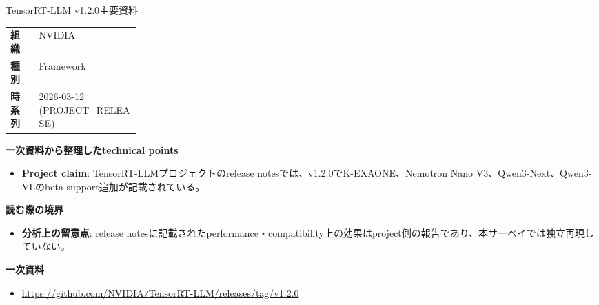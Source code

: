\begin{technicalnote}{TensorRT-LLM v1.2.0}{主要資料}
\begingroup
\begin{tabularx}{\linewidth}{@{}>{\bfseries}p{0.22\linewidth}X@{}}
組織 & NVIDIA \\
種別 & Framework \\
時系列 & 2026-03-12 (PROJECT\_RELEASE) \\
\end{tabularx}
\smallskip
{\bfseries 一次資料から整理したtechnical points}
\begin{itemize}[leftmargin=1.5em,itemsep=0.35em]
\item \textbf{Project claim}: TensorRT-LLMプロジェクトのrelease notesでは、v1.2.0でK-EXAONE、Nemotron Nano V3、Qwen3-Next、Qwen3-VLのbeta support追加が記載されている。
\end{itemize}
\begin{minipage}{\linewidth}
{\bfseries 読む際の境界}
\begin{itemize}[leftmargin=1.5em,itemsep=0.35em]
\item \textbf{分析上の留意点}: release notesに記載されたperformance・compatibility上の効果はproject側の報告であり、本サーベイでは独立再現していない。
\end{itemize}
\begin{samepage}
{\bfseries 一次資料}
\begingroup\sloppy
\begin{itemize}[leftmargin=1.5em,itemsep=0.25em]
\item {\scriptsize\url{https://github.com/NVIDIA/TensorRT-LLM/releases/tag/v1.2.0}}
\end{itemize}
\endgroup
\end{samepage}
\end{minipage}
\endgroup
\end{technicalnote}
\medskip

